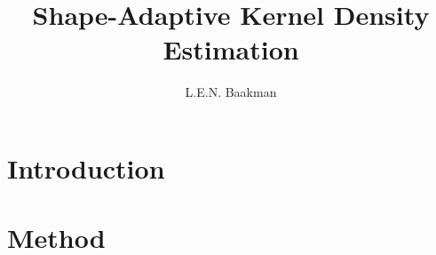 \documentclass[10pt, a4paper, twocolumn]{article}
\title{Shape-Adaptive Kernel Density Estimation}
\author{L.E.N. Baakman}
\begin{document}
\maketitle



\section{Introduction}
\label{s:introduction}


\section{Method}
\label{s:method}

	
\printbibliography
\end{document}
